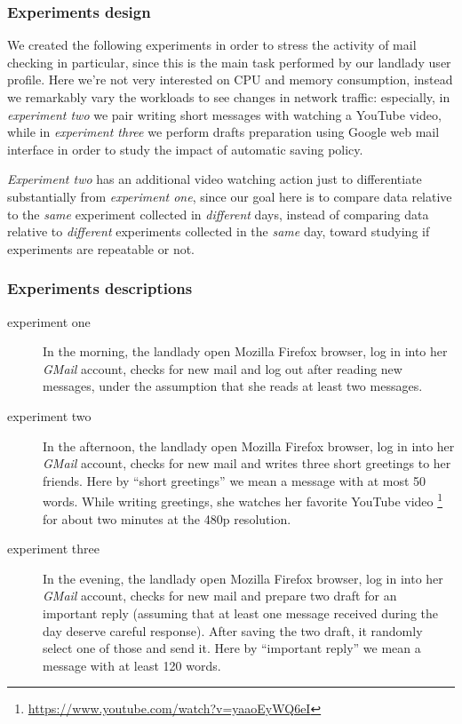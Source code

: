 \documentclass[10pt,a4paper]{article}
\begin{document}
    \subsubsection*{Experiments design }
    We created the following experiments in order to stress the
    activity of mail checking in particular, since this is the main
    task performed by our landlady user profile. Here we're not very
    interested on CPU and memory consumption, instead we remarkably
    vary the workloads to see changes in network traffic: especially,
    in \emph{experiment two} we pair writing short messages with
    watching a YouTube video, while in \emph{experiment three} we
    perform drafts preparation using Google web mail interface in
    order to study the impact of automatic saving policy.

    \emph{Experiment two} has an additional video watching action just
    to differentiate substantially from \emph{experiment one}, since
    our goal here is to compare data relative to the \emph{same}
    experiment collected in \emph{different} days, instead of
    comparing data relative to \emph{different} experiments collected
    in the \emph{same} day, toward studying if experiments are
    repeatable or not.

    \subsubsection*{Experiments descriptions}
    
    \begin{description}
    \item[experiment one] In the morning, the landlady open Mozilla
      Firefox browser, log in into her \emph{GMail} account, checks for
      new mail and log out after reading new messages, under the
      assumption that she reads at least two messages.
    \item[experiment two] In the afternoon, the landlady open Mozilla
      Firefox browser, log in into her \emph{GMail} account, checks
      for new mail and writes three short greetings to her
      friends. Here by ``short greetings'' we mean a message with at
      most 50 words.  While writing greetings, she watches her
      favorite YouTube video
      \footnote{\url{https://www.youtube.com/watch?v=yaaoEyWQ6eI}} for
      about two minutes at the 480p resolution.
    \item[experiment three] In the evening, the landlady open Mozilla
      Firefox browser, log in into her \emph{GMail} account, checks for
      new mail and prepare two draft for an important reply (assuming
      that at least one message received during the day deserve
      careful response). After saving the two draft, it randomly
      select one of those and send it. Here by ``important reply'' we
      mean a message with at least 120 words.
    \end{description}
\end{document}
